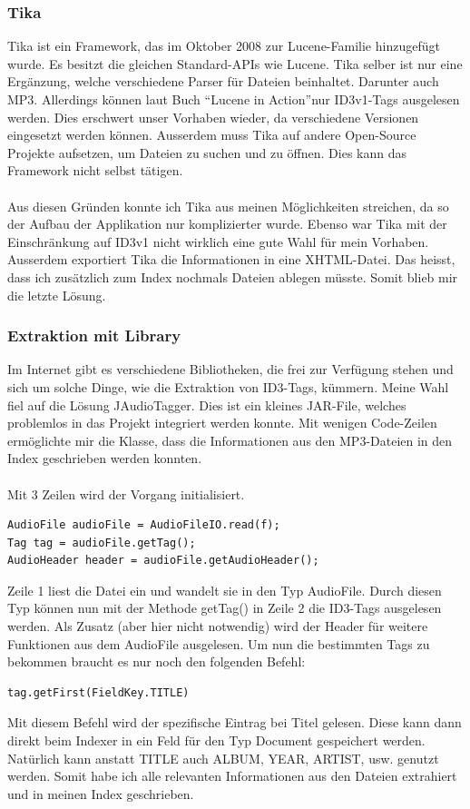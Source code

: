 \documentclass[12pt,a4paper,ngerman]{report}
\begin{document}
\subsubsection{Tika}
Tika ist ein Framework, das im Oktober 2008 zur Lucene-Familie hinzugefügt wurde. Es besitzt die gleichen Standard-APIs wie Lucene. Tika selber ist nur eine Ergänzung, welche verschiedene Parser für Dateien beinhaltet. Darunter auch MP3. Allerdings können laut Buch \textquotedblleft Lucene in Action\textquotedblright nur ID3v1-Tags ausgelesen werden. Dies erschwert unser Vorhaben wieder, da verschiedene Versionen eingesetzt werden können. Ausserdem muss Tika auf andere Open-Source Projekte aufsetzen, um Dateien zu suchen und zu öffnen. Dies kann das Framework nicht selbst tätigen.\\
\\
Aus diesen Gründen konnte ich Tika aus meinen Möglichkeiten streichen, da so der Aufbau der Applikation nur komplizierter wurde. Ebenso war Tika mit der Einschränkung auf ID3v1 nicht wirklich eine gute Wahl für mein Vorhaben. Ausserdem exportiert Tika die Informationen in eine XHTML-Datei. Das heisst, dass ich zusätzlich zum Index nochmals Dateien ablegen müsste. Somit blieb mir die letzte Lösung.
\subsubsection{Extraktion mit Library}
Im Internet gibt es verschiedene Bibliotheken, die frei zur Verfügung stehen und sich um solche Dinge, wie die Extraktion von ID3-Tags, kümmern. Meine Wahl fiel auf die Lösung JAudioTagger. Dies ist ein kleines JAR-File, welches problemlos in das Projekt integriert werden konnte. Mit wenigen Code-Zeilen ermöglichte mir die Klasse, dass die Informationen aus den MP3-Dateien in den Index geschrieben werden konnten.
\\
\\
Mit 3 Zeilen wird der Vorgang initialisiert. 
\begin{lstlisting}
AudioFile audioFile = AudioFileIO.read(f);
Tag tag = audioFile.getTag();
AudioHeader header = audioFile.getAudioHeader();
\end{lstlisting}
Zeile 1 liest die Datei ein und wandelt sie in den Typ AudioFile. Durch diesen Typ können nun mit der Methode getTag() in Zeile 2 die ID3-Tags ausgelesen werden. Als Zusatz (aber hier nicht notwendig) wird der Header für weitere Funktionen aus dem AudioFile ausgelesen. Um nun die bestimmten Tags zu bekommen braucht es nur noch den folgenden Befehl:
\begin{lstlisting}
tag.getFirst(FieldKey.TITLE)
\end{lstlisting}
Mit diesem Befehl wird der spezifische Eintrag bei Titel gelesen. Diese kann dann direkt beim Indexer in ein Feld für den Typ Document gespeichert werden. Natürlich kann anstatt TITLE auch ALBUM, YEAR, ARTIST, usw. genutzt werden. Somit habe ich alle relevanten Informationen aus den Dateien extrahiert und in meinen Index geschrieben.
\newpage
\end{document}
